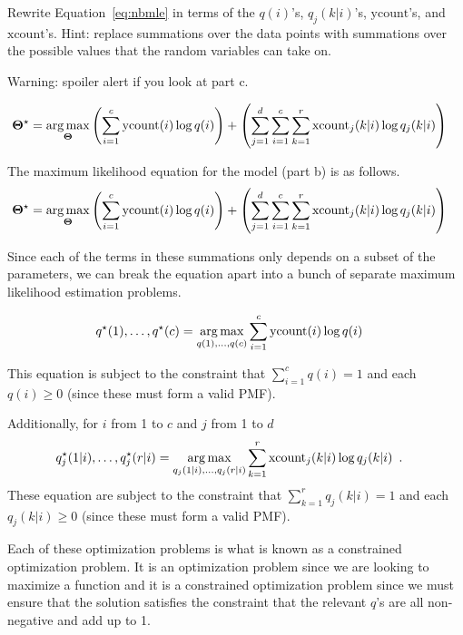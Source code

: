\documentclass[assignment03_Solutions]{subfiles}
\begin{document}
\begin{exercise}[(60 minutes)]
Rewrite Equation~\ref{eq:nbmle} in terms of the $q(i)$'s, $q_{j}(k|i)$'s, $\mbox{ycount}$'s, and $\mbox{xcount}$'s.  Hint: replace summations over the data points with summations over the possible values that the random variables can take on.

Warning: spoiler alert if you look at part c.
\begin{boxedsolution}
\begin{align}
\mathbf{\Theta}^\star &= \operatorname*{arg\,max}_{\mathbf{\Theta}} \left ( \sum_{i=1}^c \mbox{ycount}(i) \log q(i)  \right) +  \left ( \sum_{j=1}^d \sum_{i=1}^c \sum_{k=1}^r \mbox{xcount}_j(k|i) \log q_j(k|i) \right )
\end{align}
\end{boxedsolution}

\item The maximum likelihood equation for the model (part b) is as follows.
\begin{align}
\mathbf{\Theta}^\star &= \operatorname*{arg\,max}_{\mathbf{\Theta}} \left ( \sum_{i=1}^c \mbox{ycount}(i) \log q(i)  \right) +  \left ( \sum_{j=1}^d \sum_{i=1}^c \sum_{k=1}^r \mbox{xcount}_j(k|i) \log q_j(k|i) \right ) \label{eq:mleparameterized}
\end{align}

Since each of the terms in these summations only depends on a subset of the parameters, we can break the equation apart into a bunch of separate maximum likelihood estimation problems.

\begin{align}
q^\star(1), \ldots, q^\star(c)&= \operatorname*{arg\,max}_{q(1), \ldots, q(c)}\sum_{i=1}^c \mbox{ycount}(i) \log q(i) \label{eq:qmarginals}
\end{align}

This equation is subject to the constraint that $\sum_{i=1}^c q(i) = 1$ and each $q(i) \geq 0$ (since these must form a valid PMF).

Additionally, for $i$ from 1 to $c$ and $j$ from 1 to $d$
\begin{align}
q_j^\star(1|i), \ldots, q^\star_j(r|i) &= \operatorname*{arg\,max}_{q_j(1|i), \ldots, q_j(r|i)}\sum_{k=1}^r \mbox{xcount}_j(k|i) \log q_j(k|i) \enspace . \label{eq:qconditionals}
\end{align}
These equation are subject to the constraint that $\sum_{k=1}^r q_j(k|i) = 1$  and each $q_j(k|i) \geq 0$ (since these must form a valid PMF).


Each of these optimization problems is what is known as a constrained optimization problem.  It is an optimization problem since we are looking to maximize a function and it is a constrained optimization problem since we must ensure that the solution satisfies the constraint that the relevant $q$'s are all non-negative and add up to 1.


\end{exercise}
\end{document}
